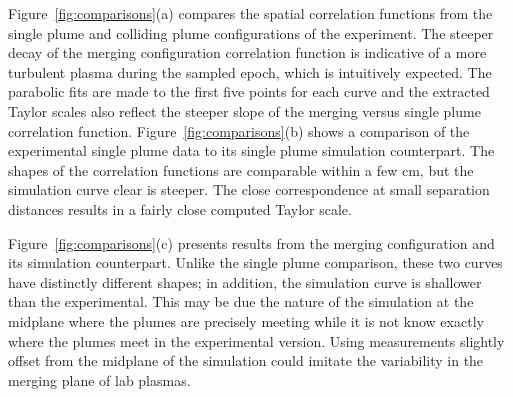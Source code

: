 \documentclass[aip,prl,amsmath,amssymb,reprint,superscriptaddress]{revtex4-1} %
\begin{document}
Figure~\ref{fig:comparisons}(a) compares the spatial correlation functions from the single plume and colliding plume configurations of the experiment. The steeper decay of the merging configuration correlation function is indicative of a more turbulent plasma during the sampled epoch, which is intuitively expected. The parabolic fits are made to the first five points for each curve and the extracted Taylor scales also reflect the steeper slope of the merging versus single plume correlation function. Figure~\ref{fig:comparisons}(b) shows a comparison of the experimental single plume data to its single plume simulation counterpart. The shapes of the correlation functions are comparable within a few cm, but the simulation curve clear is steeper. The close correspondence at small separation distances results in a fairly close computed Taylor scale.


Figure~\ref{fig:comparisons}(c) presents results from the merging configuration and its simulation counterpart. Unlike the single plume comparison, these two curves have distinctly different shapes; in addition, the simulation curve is shallower than the experimental. This may be due the nature of the simulation at the midplane where the plumes are precisely meeting while it is not know exactly where the plumes meet in the experimental version. Using measurements slightly offset from the midplane of the simulation could imitate the variability in the merging plane of lab plasmas.
\end{document}
